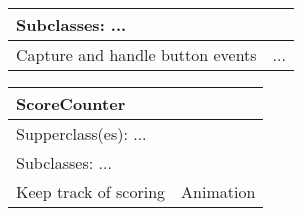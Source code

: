 \begin{figure}[H]
\begin{subfigure}{}
\begin{tabular}{|p{1in}|p{1in}|}
			\multicolumn{2}{|p{2in}|}{Subclasses: ...} \\ \hline
			Capture and handle button events & ... \\ \hline
		\end{tabular}
\end{subfigure}
\begin{subfigure}{}		
		\begin{tabular}{|p{1in}|p{1in}|}
			\hline
			\multicolumn{2}{|p{2in}|}{\textbf{ScoreCounter}} \\ \hline
			\multicolumn{2}{|p{2in}|}{Supperclass(es): ...} \\ \hline
			\multicolumn{2}{|p{2in}|}{Subclasses: ...} \\ \hline
			Keep track of scoring & Animation \\ \hline
		\end{tabular}

\end{subfigure}

\end{figure}
%